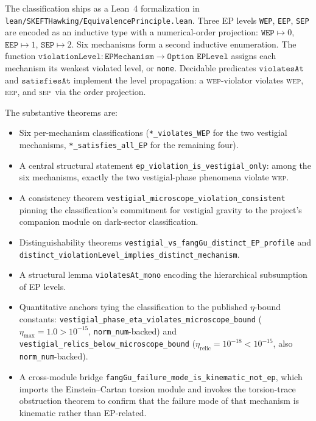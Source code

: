 \documentclass[twocolumn]{revtex4-2}
\newcommand{\WEP}{\textsc{wep}}
\newcommand{\EEP}{\textsc{eep}}
\newcommand{\SEP}{\textsc{sep}}
\begin{document}
The classification ships as a Lean~4 formalization in
\texttt{lean/SKEFTHawking/EquivalencePrinciple.lean}. Three EP levels
\texttt{WEP}, \texttt{EEP}, \texttt{SEP} are encoded as an inductive
type with a numerical-order projection:
$\texttt{WEP} \mapsto 0$, $\texttt{EEP} \mapsto 1$, $\texttt{SEP}
\mapsto 2$. Six mechanisms form a second inductive enumeration. The
function
$\texttt{violationLevel} : \texttt{EPMechanism} \to \texttt{Option
EPLevel}$
assigns each mechanism its weakest violated level, or \texttt{none}.
Decidable predicates $\texttt{violatesAt}$ and $\texttt{satisfiesAt}$
implement the level propagation: a \WEP-violator violates \WEP,
\EEP, and \SEP\ via the order projection.

The substantive theorems are:

\begin{itemize}
\item Six per-mechanism classifications (\texttt{*\_violates\_WEP} for
the two vestigial mechanisms, \texttt{*\_satisfies\_all\_EP} for the
remaining four).
\item A central structural statement
\texttt{ep\_violation\_is\_vestigial\_only}: among the six mechanisms,
exactly the two vestigial-phase phenomena violate \WEP.
\item A consistency theorem
\texttt{vestigial\_microscope\_violation\_consistent} pinning the
classification's commitment for vestigial gravity to the project's
companion module on dark-sector classification.
\item Distinguishability theorems
\texttt{vestigial\_vs\_fangGu\_distinct\_EP\_profile} and
\texttt{distinct\_violationLevel\_implies\_distinct\_mechanism}.
\item A structural lemma \texttt{violatesAt\_mono} encoding the
hierarchical subsumption of EP levels.
\item Quantitative anchors tying the classification to the published
$\eta$-bound constants:
\texttt{vestigial\_phase\_eta\_violates\_microscope\_bound}
($\eta_{\max} = 1.0 > 10^{-15}$, \texttt{norm\_num}-backed) and
\texttt{vestigial\_relics\_below\_microscope\_bound}
($\eta_{\mathrm{relic}} = 10^{-18} < 10^{-15}$, also \texttt{norm\_num}-backed).
\item A cross-module bridge \texttt{fangGu\_failure\_mode\_is\_kinematic\_not\_ep},
which imports the Einstein--Cartan torsion module and invokes the
torsion-trace obstruction theorem to confirm that the failure mode
of that mechanism is kinematic rather than EP-related.
\end{itemize}
\end{document}
